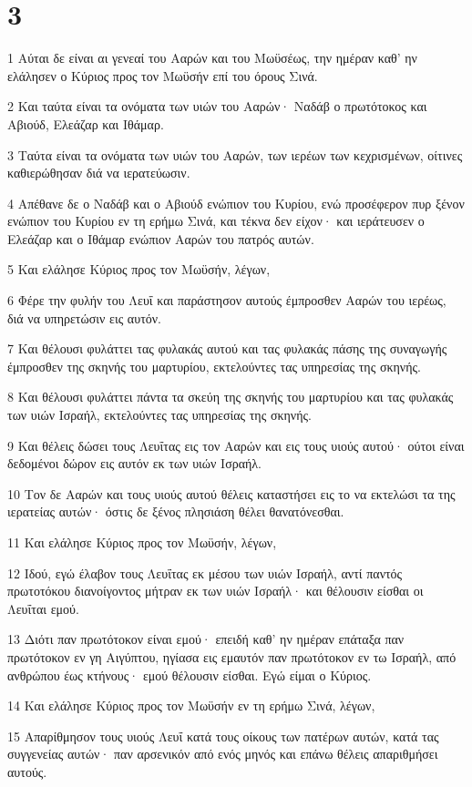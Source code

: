 \chapter{3}

\par 1 Αύται δε είναι αι γενεαί του Ααρών και του Μωϋσέως, την ημέραν καθ' ην ελάλησεν ο Κύριος προς τον Μωϋσήν επί του όρους Σινά.
\par 2 Και ταύτα είναι τα ονόματα των υιών του Ααρών· Ναδάβ ο πρωτότοκος και Αβιούδ, Ελεάζαρ και Ιθάμαρ.
\par 3 Ταύτα είναι τα ονόματα των υιών του Ααρών, των ιερέων των κεχρισμένων, οίτινες καθιερώθησαν διά να ιερατεύωσιν.
\par 4 Απέθανε δε ο Ναδάβ και ο Αβιούδ ενώπιον του Κυρίου, ενώ προσέφερον πυρ ξένον ενώπιον του Κυρίου εν τη ερήμω Σινά, και τέκνα δεν είχον· και ιεράτευσεν ο Ελεάζαρ και ο Ιθάμαρ ενώπιον Ααρών του πατρός αυτών.
\par 5 Και ελάλησε Κύριος προς τον Μωϋσήν, λέγων,
\par 6 Φέρε την φυλήν του Λευΐ και παράστησον αυτούς έμπροσθεν Ααρών του ιερέως, διά να υπηρετώσιν εις αυτόν.
\par 7 Και θέλουσι φυλάττει τας φυλακάς αυτού και τας φυλακάς πάσης της συναγωγής έμπροσθεν της σκηνής του μαρτυρίου, εκτελούντες τας υπηρεσίας της σκηνής.
\par 8 Και θέλουσι φυλάττει πάντα τα σκεύη της σκηνής του μαρτυρίου και τας φυλακάς των υιών Ισραήλ, εκτελούντες τας υπηρεσίας της σκηνής.
\par 9 Και θέλεις δώσει τους Λευΐτας εις τον Ααρών και εις τους υιούς αυτού· ούτοι είναι δεδομένοι δώρον εις αυτόν εκ των υιών Ισραήλ.
\par 10 Τον δε Ααρών και τους υιούς αυτού θέλεις καταστήσει εις το να εκτελώσι τα της ιερατείας αυτών· όστις δε ξένος πλησιάση θέλει θανατόνεσθαι.
\par 11 Και ελάλησε Κύριος προς τον Μωϋσήν, λέγων,
\par 12 Ιδού, εγώ έλαβον τους Λευΐτας εκ μέσου των υιών Ισραήλ, αντί παντός πρωτοτόκου διανοίγοντος μήτραν εκ των υιών Ισραήλ· και θέλουσιν είσθαι οι Λευΐται εμού.
\par 13 Διότι παν πρωτότοκον είναι εμού· επειδή καθ' ην ημέραν επάταξα παν πρωτότοκον εν γη Αιγύπτου, ηγίασα εις εμαυτόν παν πρωτότοκον εν τω Ισραήλ, από ανθρώπου έως κτήνους· εμού θέλουσιν είσθαι. Εγώ είμαι ο Κύριος.
\par 14 Και ελάλησε Κύριος προς τον Μωϋσήν εν τη ερήμω Σινά, λέγων,
\par 15 Απαρίθμησον τους υιούς Λευΐ κατά τους οίκους των πατέρων αυτών, κατά τας συγγενείας αυτών· παν αρσενικόν από ενός μηνός και επάνω θέλεις απαριθμήσει αυτούς.
